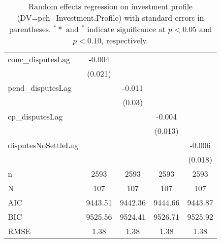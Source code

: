 \begin{table}[ht]
\begin{tabular}{lcccc}
  conc\_disputesLag & -0.004 &  &  &  \\ 
   & (0.021) &  &  &  \\ 
  pend\_disputesLag &  & -0.011 &  &  \\ 
   &  & (0.03) &  &  \\ 
  cp\_disputesLag &  &  & -0.004 &  \\ 
   &  &  & (0.013) &  \\ 
  disputesNoSettleLag &  &  &  & -0.006 \\ 
   &  &  &  & (0.018) \\ 
   \hline
n & 2593 & 2593 & 2593 & 2593 \\ 
  N & 107 & 107 & 107 & 107 \\ 
  AIC & 9443.51 & 9442.36 & 9444.66 & 9443.87 \\ 
  BIC & 9525.56 & 9524.41 & 9526.71 & 9525.92 \\ 
  RMSE & 1.38 & 1.38 & 1.38 & 1.38 \\ 
   \hline
\hline
\end{tabular}
\caption{Random effects regression on investment profile (DV=pch\_Investment.Profile) with standard errors in parentheses. $^**$ and $^*$ indicate significance at $p< 0.05 $ and $p< 0.10 $, respectively.} 
\end{table}
